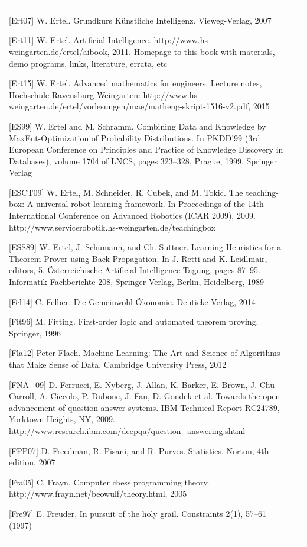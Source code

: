 \documentclass[10pt]{book}
\begin{document}
\begin{tabular}{|l|l|}
[Ert07] W. Ertel. Grundkurs K\"unstliche Intelligenz. Vieweg-Verlag, 2007

[Ert11] W. Ertel. Artificial Intelligence. http://www.hs-weingarten.de/ertel/aibook, 2011. Homepage to this book with materials, demo programs, links, literature, errata, etc

[Ert15] W. Ertel. Advanced mathematics for engineers. Lecture notes, Hochschule Ravensburg-Weingarten: http://www.hs-weingarten.de/ertel/vorlesungen/mae/matheng-skript-1516-v2.pdf, 2015

[ES99] W. Ertel and M. Schramm. Combining Data and Knowledge by MaxEnt-Optimization of Probability Distributions. In PKDD'99 (3rd European Conference on Principles and Practice of Knowledge Discovery in Databases), volume 1704 of LNCS, pages 323--328, Prague, 1999. Springer Verlag

[ESCT09] W. Ertel, M. Schneider, R. Cubek, and M. Tokic. The teaching-box: A universal robot learning framework. In Proceedings of the 14th International Conference on Advanced Robotics (ICAR 2009), 2009. http://www.servicerobotik.hs-weingarten.de/teachingbox

[ESS89] W. Ertel, J. Schumann, and Ch. Suttner. Learning Heuristics for a Theorem Prover using Back Propagation. In J. Retti and K. Leidlmair, editors, 5. \"Osterreichische Artificial-Intelligence-Tagung, pages 87--95. Informatik-Fachberichte 208, Springer-Verlag, Berlin, Heidelberg, 1989

[Fel14] C. Felber. Die Gemeinwohl-\"Okonomie. Deuticke Verlag, 2014

[Fit96] M. Fitting. First-order logic and automated theorem proving. Springer, 1996

[Fla12] Peter Flach. Machine Learning: The Art and Science of Algorithms that Make Sense of Data. Cambridge University Press, 2012

[FNA+09] D. Ferrucci, E. Nyberg, J. Allan, K. Barker, E. Brown, J. Chu-Carroll, A. Ciccolo, P. Duboue, J. Fan, D. Gondek et al. Towards the open advancement of question answer systems. IBM Technical Report RC24789, Yorktown Heights, NY, 2009. http://www.research.ibm.com/deepqa/question\_answering.shtml

[FPP07] D. Freedman, R. Pisani, and R. Purves. Statistics. Norton, 4th edition, 2007

[Fra05] C. Frayn. Computer chess programming theory. http://www.frayn.net/beowulf/theory.html, 2005

[Fre97] E. Freuder, In pursuit of the holy grail. Constraints 2(1), 57--61 (1997)


\end{tabular}
\end{document}
